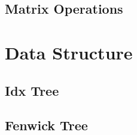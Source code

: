 \documentclass[10pt,landscape,a4paper,twocolumn]{article}
\begin{document}
%

\subsection{Matrix Operations}


%

%


\section{Data Structure}

\subsection{Idx Tree}

%

\subsection{Fenwick Tree}


%

%
\end{document}
